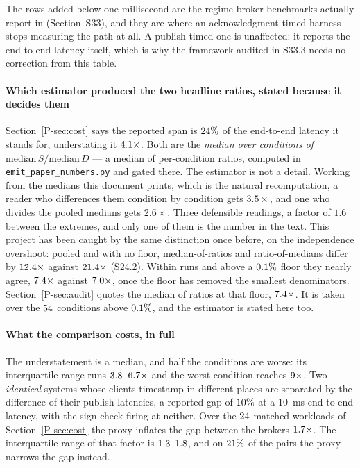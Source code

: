 \documentclass[10pt,journal,onecolumn]{IEEEtran}
\newcommand{\mainAudit}{\ref{P-sec:audit}}           %
\newcommand{\mainCost}{\ref{P-sec:cost}}              %
\begin{document}
The rows added below one millisecond are the regime broker benchmarks actually report in (Section~S33), and they are where an acknowledgment-timed harness stops measuring the path at all. A publish-timed one is unaffected: it reports the end-to-end latency itself, which is why the framework audited in S33.3 needs no correction from this table.

\paragraph{Which estimator produced the two headline ratios, stated because it decides them}
Section~\mainCost{} says the reported span is $24\%$ of the end-to-end latency it stands for,
understating it $4.1\times$. Both are the \emph{median over conditions of
$\mathrm{median}\,S / \mathrm{median}\,D$} --- a median of per-condition ratios, computed in
\texttt{emit\_paper\_numbers.py} and gated there. The estimator is not a detail. Working from
the medians this document prints, which is the natural recomputation, a reader who
differences them condition by condition gets $3.5\times$, and one who divides the pooled
medians gets $2.6\times$. Three defensible readings, a factor of $1.6$ between the extremes,
and only one of them is the number in the text. This project has been caught by the same
distinction once before, on the independence overshoot: pooled and with no floor,
median-of-ratios and ratio-of-medians differ by $12.4\times$ against
$21.4\times$ (S24.2). Within runs and above a $0.1\%$ floor they nearly
agree, $7.4\times$ against $7.0\times$, once the
floor has removed the smallest denominators. Section~\mainAudit{} quotes the median of ratios at
that floor, $7.4\times$. It is taken over the $54$ conditions
above $0.1\%$, and the estimator is stated here too.

\paragraph{What the comparison costs, in full} The understatement is a median, and half the
conditions are worse: its interquartile range runs $3.8$--$6.7\times$
and the worst condition reaches $9\times$. Two \emph{identical} systems whose
clients timestamp in different places are separated by the difference of their publish latencies, a reported
gap of $10\%$ at a $10$~ms end-to-end latency, with the sign check firing at neither. Over the
$24$ matched workloads of Section~\mainCost{} the proxy inflates the gap between
the brokers $1.7\times$. The interquartile range of that factor is
$\gapDistortionPairedIQR$, and on $21\%$ of the pairs the proxy narrows the
gap instead.
\end{document}
